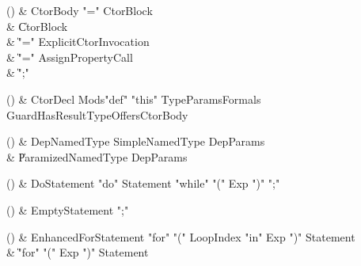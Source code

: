 \begin{bbgrammarappendix}

() & CtorBody \label{prod:CtorBody}  \: \xcd"=" CtorBlock  \\

 &    \| CtorBlock \\
 &    \| \xcd"=" ExplicitCtorInvocation \\
 &    \| \xcd"=" AssignPropertyCall \\
 &    \| \xcd";" \\

\end{bbgrammarappendix}

\begin{bbgrammarappendix}

() & CtorDecl \label{prod:CtorDecl}  \: Mods\opt \xcd"def" \xcd"this" TypeParams\opt Formals Guard\opt HasResultType\opt Offers\opt CtorBody  \\


\end{bbgrammarappendix}

\begin{bbgrammarappendix}

() & DepNamedType \label{prod:DepNamedType}  \: SimpleNamedType DepParams  \\

 &    \| ParamizedNamedType DepParams \\

\end{bbgrammarappendix}

\begin{bbgrammarappendix}

() & DoStatement \label{prod:DoStatement}  \: \xcd"do" Statement \xcd"while" \xcd"(" Exp \xcd")" \xcd";"  \\


\end{bbgrammarappendix}

\begin{bbgrammarappendix}

() & EmptyStatement \label{prod:EmptyStatement}  \: \xcd";"  \\


\end{bbgrammarappendix}

\begin{bbgrammarappendix}

() & EnhancedForStatement \label{prod:EnhancedForStatement}  \: \xcd"for" \xcd"(" LoopIndex \xcd"in" Exp \xcd")" Statement  \\

 &    \| \xcd"for" \xcd"(" Exp \xcd")" Statement \\

\end{bbgrammarappendix}

